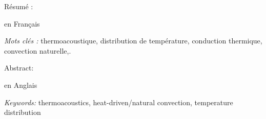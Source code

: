 {
\scriptsize

\vfill

{\Large Résumé :}\medskip

en Français

\bigskip

{\large \textit{Mots clés :}} thermoacoustique,  distribution de température, conduction thermique, convection naturelle,.

\vfill

{\Large Abstract:}\medskip

en Anglais

\bigskip

{\large \textit{Keywords:}} thermoacoustics, heat-driven/natural convection, temperature distribution

\vfill
}